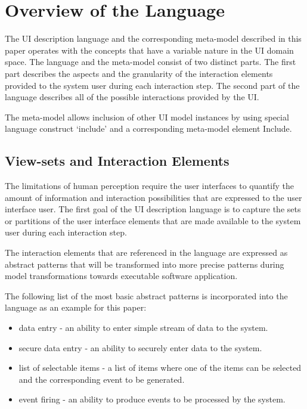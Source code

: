 \documentclass[conference]{IEEEtran}
\begin{document}
\section{Overview of the Language}

The UI description language and the corresponding meta-model described in this
paper operates with the concepts that have a variable nature in the UI domain
space. The language and the meta-model consist of two distinct parts. The first
part describes the aspects and the granularity of the interaction elements
provided to the system user during each interaction step. The second part of
the language describes all of the possible interactions provided by the UI.

The meta-model allows inclusion of other UI model instances by using special
language construct ‘include’ and a corresponding meta-model element Include.

\subsection{View-sets and Interaction Elements}

The limitations of human perception require the user interfaces to quantify the
amount of information and interaction possibilities that are expressed to the
user interface user.  The first goal of the UI description language is to
capture the sets or partitions of the user interface elements that are made
available to the system user during each interaction step.

The interaction elements that are referenced in the language are expressed as
abstract patterns that will be transformed into more precise patterns during
model transformations towards executable software application.

The following list of the most basic abstract patterns is incorporated into the
language as an example for this paper:

\begin{itemize}
  \item data entry - an ability to enter simple stream of data to the system.
  \item secure data entry - an ability to securely enter data to the system.
  \item list of selectable items - a list of items where one of the items can
    be selected and the corresponding event to be generated.
  \item event firing - an ability to produce events to be processed by the
    system.
\end{itemize}
\end{document}
